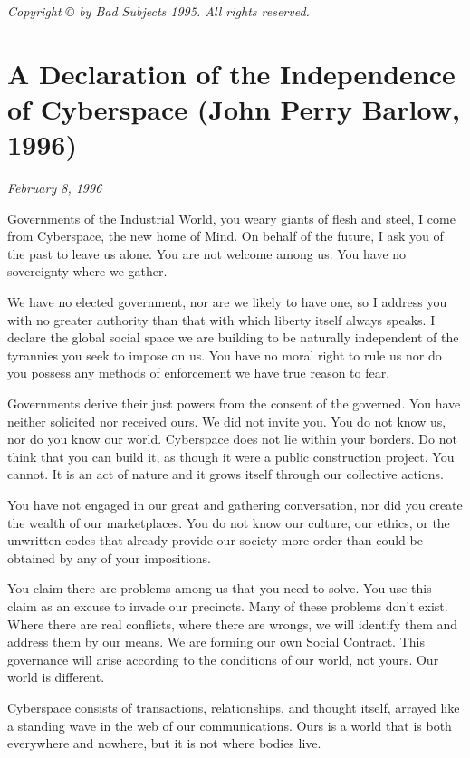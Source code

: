 \documentclass[letterpaper,12pt,english]{sphinxmanual}
\begin{document}
\emph{Copyright © by Bad Subjects 1995. All rights reserved.}


\chapter{A Declaration of the Independence of Cyberspace (John Perry Barlow, 1996)}
\label{1996::doc}\label{1996:a-declaration-of-the-independence-of-cyberspace-john-perry-barlow-1996}
\emph{February 8, 1996}

Governments of the Industrial World, you weary giants of flesh and steel, I come from Cyberspace, the new home of Mind. On behalf of the future, I ask you of the past to leave us alone. You are not welcome among us. You have no sovereignty where we gather.

We have no elected government, nor are we likely to have one, so I address you with no greater authority than that with which liberty itself always speaks. I declare the global social space we are building to be naturally independent of the tyrannies you seek to impose on us. You have no moral right to rule us nor do you possess any methods of enforcement we have true reason to fear.

Governments derive their just powers from the consent of the governed. You have neither solicited nor received ours. We did not invite you. You do not know us, nor do you know our world. Cyberspace does not lie within your borders. Do not think that you can build it, as though it were a public construction project. You cannot. It is an act of nature and it grows itself through our collective actions.

You have not engaged in our great and gathering conversation, nor did you create the wealth of our marketplaces. You do not know our culture, our ethics, or the unwritten codes that already provide our society more order than could be obtained by any of your impositions.

You claim there are problems among us that you need to solve. You use this claim as an excuse to invade our precincts. Many of these problems don't exist. Where there are real conflicts, where there are wrongs, we will identify them and address them by our means. We are forming our own Social Contract. This governance will arise according to the conditions of our world, not yours. Our world is different.

Cyberspace consists of transactions, relationships, and thought itself, arrayed like a standing wave in the web of our communications. Ours is a world that is both everywhere and nowhere, but it is not where bodies live.
\end{document}
